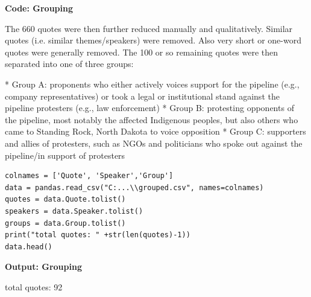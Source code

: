 \textbf{Code: Grouping}

The 660 quotes were then further reduced manually and qualitatively. Similar quotes (i.e. similar themes/speakers) were removed. Also very short or one-word quotes were generally removed. The 100 or so remaining quotes were then separated into one of three groups:

* Group A: proponents who either actively voices support for the pipeline (e.g., company representatives) or took a legal or institutional stand against the pipeline protesters (e.g., law enforcement)
* Group B: protesting opponents of the pipeline, most notably the affected Indigenous peoples, but also others who came to Standing Rock, North Dakota to voice opposition
* Group C: supporters and allies of protesters, such as NGOs and politicians who spoke out against the pipeline/in support of protesters

\begin{lstlisting}
colnames = ['Quote', 'Speaker','Group']
data = pandas.read_csv("C:...\\grouped.csv", names=colnames)
quotes = data.Quote.tolist()
speakers = data.Speaker.tolist()
groups = data.Group.tolist()
print("total quotes: " +str(len(quotes)-1))
data.head() 
\end{lstlisting}

\textbf{Output: Grouping}

\begin{footnotesize}
total quotes: 92

\begin{table}[H]
\end{table}
\end{footnotesize}


